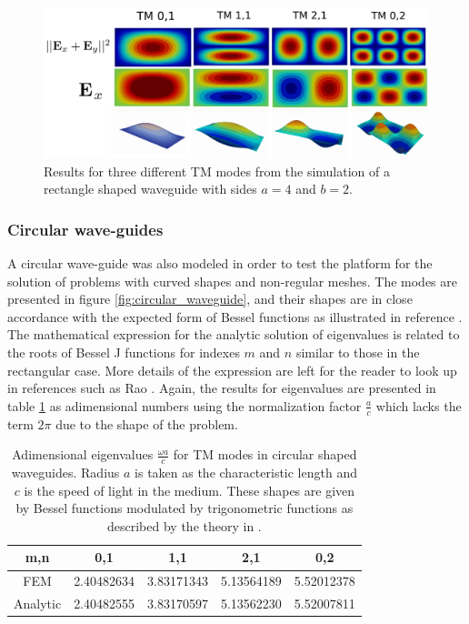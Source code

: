 \begin{figure}
\centering
\includegraphics[scale=0.1]{./img/rectangular_waveguide.pdf}
\caption{Results for three different TM modes from the simulation of a rectangle shaped waveguide with sides $a=4$ and $b=2$.}
\label{fig:rectangular_waveguide}
\end{figure}


\subsubsection{Circular wave-guides}

A circular wave-guide was also modeled in order to test the platform for the solution of problems with curved shapes and non-regular meshes. The modes are presented in figure \ref{fig:circular_waveguide}, and their shapes are in close accordance with the expected form of Bessel functions as illustrated in reference \cite{Soto2009}. The mathematical expression for the analytic solution of eigenvalues is related to the roots of Bessel J functions for indexes $m$ and $n$ similar to those in the rectangular case. More details of the expression are left for the reader to look up in references such as Rao \cite{Rao2004}. 
Again, the results for eigenvalues are presented in table \ref{tab:cir_wav_comparison} as adimensional numbers using the normalization factor $\frac{a}{c}$ which lacks the term $2\pi$ due to the shape of the problem.
\begin{table}
\begin{center}
\begin{tabular}{|c|c|c|c|c|}
\hline 
m,n & 0,1 & 1,1 & 2,1 & 0,2 \\ 
\hline 
FEM     & 2.40482634 & 3.83171343 & 5.13564189 & 5.52012378 \\ 
\hline 
Analytic & 2.40482555 & 3.83170597 & 5.13562230 & 5.52007811 \\ 
\hline 
\end{tabular} 
\caption{Adimensional eigenvalues $\frac{\omega a}{c}$ for TM modes in circular shaped waveguides. Radius $a$ is taken as the characteristic length and $c$ is the speed of light in the medium. These shapes are given by Bessel functions modulated by trigonometric functions as described by the theory in \cite{Rao2004}.}
\label{tab:cir_wav_comparison}
\end{center}
\end{table}

